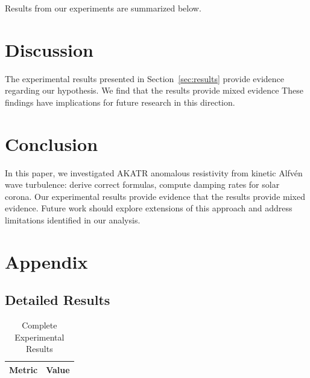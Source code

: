 \documentclass{article}
\begin{document}
\label{sec:results}

Results from our experiments are summarized below.

\section{Discussion}

The experimental results presented in Section~\ref{sec:results} provide evidence regarding our hypothesis. We find that the results provide mixed evidence These findings have implications for future research in this direction.

\section{Conclusion}

In this paper, we investigated AKATR anomalous resistivity from kinetic Alfvén wave turbulence: derive correct formulas, compute damping rates for solar corona. Our experimental results provide evidence that the results provide mixed evidence. Future work should explore extensions of this approach and address limitations identified in our analysis.

\appendix

\section{Appendix}

\subsection{Detailed Results}

\begin{table}[htbp]
\centering
\caption{Complete Experimental Results}
\begin{tabular}{lc}
\toprule
Metric & Value \\
\midrule
\bottomrule
\end{tabular}
\end{table}




\end{document}
